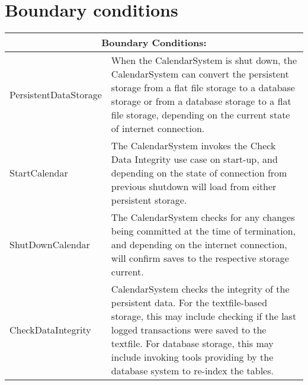 \section{Boundary conditions}

\begin{tabular}{ |l|p{10cm}| }
  \hline
  \multicolumn{2}{|c|}{Boundary Conditions:} \\
  \hline
  PersistentDataStorage & When the CalendarSystem is shut down, the CalendarSystem can convert the persistent storage from a flat file storage to a database storage or from a database storage to a flat file storage, depending on the current state of internet connection.\\
  \hline
    StartCalendar & The CalendarSystem invokes the Check Data Integrity use case on start-up, and depending on the state of connection from previous shutdown will load from either persistent storage.\\
    \hline
    ShutDownCalendar & The CalendarSystem checks for any changes being committed at the time of termination, and depending on the internet connection, will confirm saves to the respective storage current. \\
    \hline
    CheckDataIntegrity & CalendarSystem checks the integrity of the persistent data. For the textfile-based storage, this may include checking if the last logged transactions were saved to the textfile. For database storage, this may include invoking tools providing by the database system to re-index the tables. \\
  \hline
\end{tabular}